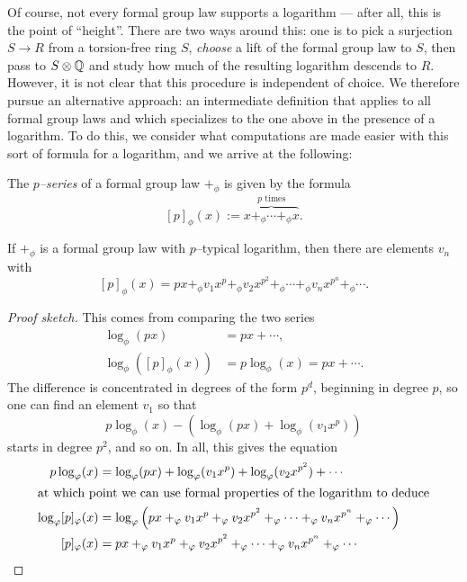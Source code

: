Of course, not every formal group law supports a logarithm --- after all, this is the point of ``height''.  There are two ways around this: one is to pick a surjection $S \to R$ from a torsion-free ring $S$, \emph{choose} a lift of the formal group law to $S$, then pass to $S \otimes \Q$ and study how much of the resulting logarithm descends to $R$.  However, it is not clear that this procedure is independent of choice.  We therefore pursue an alternative approach: an intermediate definition that applies to all formal group laws and which specializes to the one above in the presence of a logarithm.  To do this, we consider what computations are made easier with this sort of formula for a logarithm, and we arrive at the following:

\begin{definition}
The \textit{$p$--series} of a formal group law $+_\phi$ is given by the formula \[[p]_\phi(x) := \overset{\text{$p$ times}}{\overbrace{x +_\phi \cdots +_\phi x}}.\]
\end{definition}

\begin{lemma}
If $+_\phi$ is a formal group law with $p$--typical logarithm, then there are elements $v_n$ with \[[p]_\phi(x) = px +_\phi v_1 x^p +_\phi v_2 x^{p^2} +_\phi \cdots +_\phi v_n x^{p^n} +_\phi \cdots.\]
\end{lemma}
\begin{proof}[Proof sketch]
This comes from comparing the two series
\begin{align*}
\log_\phi(px) & = px + \cdots, \\
\log_\phi([p]_\phi(x)) & = p \log_\phi(x) = px + \cdots.
\end{align*}
The difference is concentrated in degrees of the form $p^d$, beginning in degree $p$, so one can find an element $v_1$ so that \[p \log_\phi(x) - (\log_\phi(px) + \log_\phi(v_1 x^p))\] starts in degree $p^2$, and so on.  In all, this gives the equation
\begin{align*}
p \log_\phi(x) & = \log_\phi (px) + \log_\phi(v_1 x^p) + \log_\phi(v_2 x^{p^2}) + \cdots \\
\intertext{at which point we can use formal properties of the logarithm to deduce}
\log_\phi [p]_\phi(x) & = \log_\phi \left(px +_\phi v_1 x^p +_\phi v_2 x^{p^2} +_\phi \cdots +_\phi v_n x^{p^n} +_\phi \cdots\right) \\
[p]_\phi(x) & = px +_\phi v_1 x^p +_\phi v_2 x^{p^2} +_\phi \cdots +_\phi v_n x^{p^n} +_\phi \cdots \qedhere
\end{align*}
\end{proof}

